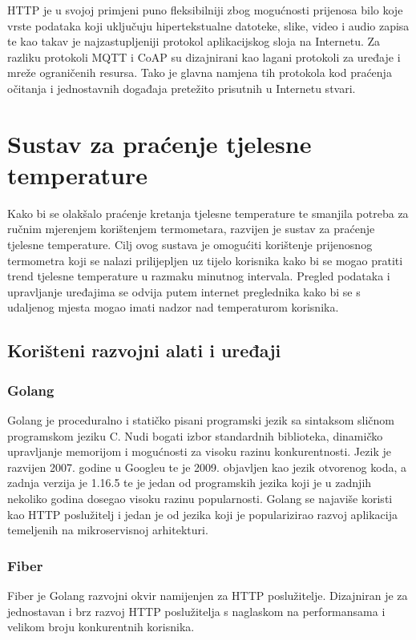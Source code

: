\documentclass[times, utf8, diplomski]{fer}
\begin{document}
HTTP je u svojoj primjeni puno fleksibilniji zbog mogućnosti prijenosa bilo koje vrste podataka koji uključuju hipertekstualne datoteke, slike, video i audio zapisa te kao takav je najzastupljeniji protokol aplikacijskog sloja na Internetu. Za razliku protokoli MQTT i CoAP su dizajnirani kao lagani protokoli za uređaje i mreže ograničenih resursa. Tako je glavna namjena tih protokola kod praćenja očitanja i jednostavnih događaja pretežito prisutnih u Internetu stvari.

\chapter{Sustav za praćenje tjelesne temperature}
Kako bi se olakšalo praćenje kretanja tjelesne temperature te smanjila potreba za ručnim mjerenjem korištenjem termometara, razvijen je sustav za praćenje tjelesne temperature. Cilj ovog sustava je omogućiti korištenje prijenosnog termometra koji se nalazi prilijepljen uz tijelo korisnika kako bi se mogao pratiti trend tjelesne temperature u razmaku minutnog intervala. Pregled podataka i upravljanje uređajima se odvija putem internet preglednika kako bi se s udaljenog mjesta mogao imati nadzor nad temperaturom korisnika.

\section{Korišteni razvojni alati i uređaji}
\subsection{Golang}
Golang\citep{Golang} je proceduralno i statičko pisani programski jezik sa sintaksom sličnom programskom jeziku C. Nudi bogati izbor standardnih biblioteka, dinamičko upravljanje memorijom i mogućnosti za visoku razinu konkurentnosti. Jezik je razvijen 2007. godine u Googleu te je 2009. objavljen kao jezik otvorenog koda, a zadnja verzija je 1.16.5 te je jedan od programskih jezika koji je u zadnjih nekoliko godina dosegao visoku razinu popularnosti. Golang se najaviše koristi kao HTTP poslužitelj i jedan je od jezika koji je popularizirao razvoj aplikacija temeljenih na mikroservisnoj arhitekturi.

\subsection{Fiber}
Fiber\citep{Fiber} je Golang razvojni okvir namijenjen za HTTP poslužitelje. Dizajniran je za jednostavan i brz razvoj HTTP poslužitelja s naglaskom na performansama i velikom broju konkurentnih korisnika. 
\end{document}
